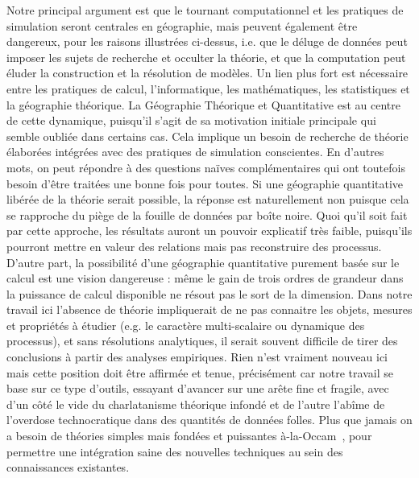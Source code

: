 {Notre principal argument est que le tournant computationnel et les pratiques de simulation seront centrales en géographie, mais peuvent également être dangereux, pour les raisons illustrées ci-dessus, i.e. que le déluge de données peut imposer les sujets de recherche et occulter la théorie, et que la computation peut éluder la construction et la résolution de modèles. Un lien plus fort est nécessaire entre les pratiques de calcul, l'informatique, les mathématiques, les statistiques et la géographie théorique. La Géographie Théorique et Quantitative est au centre de cette dynamique, puisqu'il s'agit de sa motivation initiale principale qui semble oubliée dans certains cas. Cela implique un besoin de recherche de théorie élaborées intégrées avec des pratiques de simulation conscientes. En d'autres mots, on peut répondre à des questions naïves complémentaires qui ont toutefois besoin d'être traitées une bonne fois pour toutes. Si une géographie quantitative libérée de la théorie serait possible, la réponse est naturellement non puisque cela se rapproche du piège de la fouille de données par boîte noire. Quoi qu'il soit fait par cette approche, les résultats auront un pouvoir explicatif très faible, puisqu'ils pourront mettre en valeur des relations mais pas reconstruire des processus. D'autre part, la possibilité d'une géographie quantitative purement basée sur le calcul est une vision dangereuse : même le gain de trois ordres de grandeur dans la puissance de calcul disponible ne résout pas le sort de la dimension. Dans notre travail ici l'absence de théorie impliquerait de ne pas connaitre les objets, mesures et propriétés à étudier (e.g. le caractère multi-scalaire ou dynamique des processus), et sans résolutions analytiques, il serait souvent difficile de tirer des conclusions à partir des analyses empiriques. Rien n'est vraiment nouveau ici mais cette position doit être affirmée et tenue, précisément car notre travail se base sur ce type d'outils, essayant d'avancer sur une arête fine et fragile, avec d'un côté le vide du charlatanisme théorique infondé et de l'autre l'abîme de l'overdose technocratique dans des quantités de données folles. Plus que jamais on a besoin de théories simples mais fondées et puissantes {\`a}-la-Occam~\cite{batty2016theoretical}, pour permettre une intégration saine des nouvelles techniques au sein des connaissances existantes.
}


 









